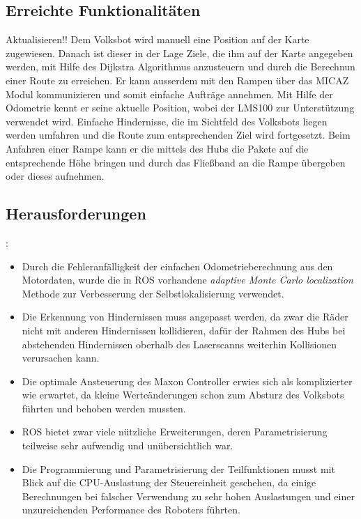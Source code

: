 \subsection{Erreichte Funktionalitäten}

Aktualisieren!!
Dem Volksbot wird manuell eine Position auf der Karte zugewiesen. Danach ist dieser in der Lage Ziele, die ihm auf der Karte angegeben werden, mit Hilfe des Dijkstra Algorithmus anzusteuern und durch die Berechnun einer Route zu erreichen. Er kann ausserdem mit den Rampen über das MICAZ Modul kommunizieren und somit einfache Aufträge annehmen. Mit Hilfe der Odometrie kennt er seine aktuelle Position, wobei der LMS100 zur Unterstützung verwendet wird. Einfache Hindernisse, die im Sichtfeld des Volksbots liegen werden umfahren und die Route zum entsprechenden Ziel wird fortgesetzt. Beim Anfahren einer Rampe kann er die mittels des Hubs die Pakete auf die entsprechende Höhe bringen und durch das Fließband an die Rampe übergeben oder dieses aufnehmen.

\subsection{Herausforderungen}:

\begin{itemize}

\item Durch die Fehleranfälligkeit der einfachen Odometrieberechnung aus den Motordaten, wurde die in ROS vorhandene \textit{adaptive Monte Carlo localization} Methode zur Verbesserung der Selbstlokalisierung verwendet.

\item Die Erkennung von Hindernissen muss angepasst werden, da zwar die Räder nicht mit anderen Hindernissen kollidieren, dafür der Rahmen des Hubs bei abstehenden Hindernissen oberhalb des Laserscanns weiterhin Kollisionen verursachen kann.

\item Die optimale Ansteuerung des Maxon Controller erwies sich als komplizierter wie erwartet, da kleine Werteänderungen schon zum Absturz des Volksbots führten und behoben werden mussten.

\item ROS bietet zwar viele nützliche Erweiterungen, deren Parametrisierung teilweise sehr aufwendig und unübersichtlich war.

\item Die Programmierung und Parametrisierung der Teilfunktionen musst mit Blick auf die CPU-Auslastung der Steuereinheit geschehen, da einige Berechnungen bei falscher Verwendung zu sehr hohen Auslastungen und einer unzureichenden Performance des Roboters führten.

\end{itemize}


